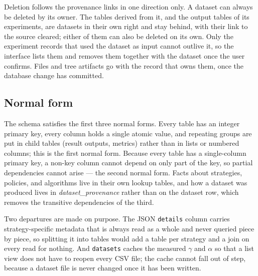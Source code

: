Deletion follows the provenance links in one direction only. A dataset can always be deleted by its owner. The tables derived from it, and the output tables of its experiments, are datasets in their own right and stay behind, with their link to the source cleared; either of them can also be deleted on its own. Only the experiment records that used the dataset as input cannot outlive it, so the interface lists them and removes them together with the dataset once the user confirms. Files and tree artifacts go with the record that owns them, once the database change has committed.

\subsection{Normal form}

The schema satisfies the first three normal forms. Every table has an integer primary key, every column holds a single atomic value, and repeating groups are put in child tables (result outputs, metrics) rather than in lists or numbered columns; this is the first normal form. Because every table has a single-column primary key, a non-key column cannot depend on only part of the key, so partial dependencies cannot arise --- the second normal form. Facts about strategies, policies, and algorithms live in their own lookup tables, and how a dataset was produced lives in \emph{dataset\_provenance} rather than on the dataset row, which removes the transitive dependencies of the third.

Two departures are made on purpose. The JSON \texttt{details} column carries strategy-specific metadata that is always read as a whole and never queried piece by piece, so splitting it into tables would add a table per strategy and a join on every read for nothing. And \texttt{datasets} caches the measured $\gamma$ and $\alpha$ so that a list view does not have to reopen every CSV file; the cache cannot fall out of step, because a dataset file is never changed once it has been written.
